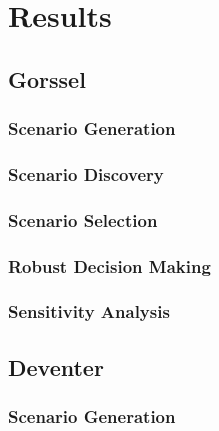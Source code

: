 \section{Results}
\label{s:results}


\subsection{Gorssel}
\subsubsection{Scenario Generation}
\subsubsection{Scenario Discovery}
\subsubsection{Scenario Selection}
\subsubsection{Robust Decision Making}
\subsubsection{Sensitivity Analysis}

\subsection{Deventer}
\subsubsection{Scenario Generation}
